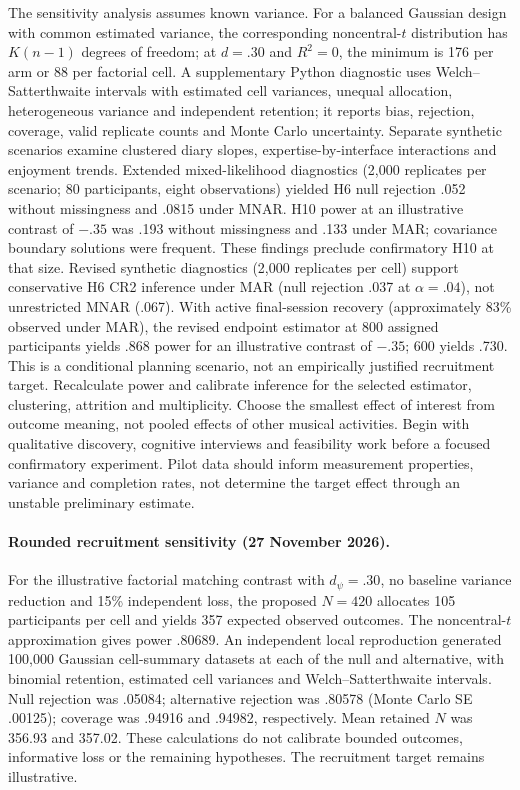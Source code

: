 The sensitivity analysis assumes known variance. For a balanced Gaussian design with common estimated variance, the corresponding noncentral-$t$ distribution has $K(n-1)$ degrees of freedom; at $d=.30$ and $R^2=0$, the minimum is 176 per arm or 88 per factorial cell. A supplementary Python diagnostic uses Welch--Satterthwaite intervals with estimated cell variances, unequal allocation, heterogeneous variance and independent retention; it reports bias, rejection, coverage, valid replicate counts and Monte Carlo uncertainty. Separate synthetic scenarios examine clustered diary slopes, expertise-by-interface interactions and enjoyment trends. Extended mixed-likelihood diagnostics (2,000 replicates per scenario; 80 participants, eight observations) yielded H6 null rejection .052 without missingness and .0815 under MNAR. H10 power at an illustrative contrast of $-.35$ was .193 without missingness and .133 under MAR; covariance boundary solutions were frequent. These findings preclude confirmatory H10 at that size. Revised synthetic diagnostics (2,000 replicates per cell) support conservative H6 CR2 inference under MAR (null rejection .037 at $\alpha=.04$), not unrestricted MNAR (.067). With active final-session recovery (approximately 83\% observed under MAR), the revised endpoint estimator at 800 assigned participants yields .868 power for an illustrative contrast of $-.35$; 600 yields .730. This is a conditional planning scenario, not an empirically justified recruitment target. Recalculate power and calibrate inference for the selected estimator, clustering, attrition and multiplicity. Choose the smallest effect of interest from outcome meaning, not pooled effects of other musical activities. Begin with qualitative discovery, cognitive interviews and feasibility work before a focused confirmatory experiment. Pilot data should inform measurement properties, variance and completion rates, not determine the target effect through an unstable preliminary estimate.


\paragraph{Rounded recruitment sensitivity (27 November 2026).}
For the illustrative factorial matching contrast with $d_\psi=.30$, no baseline variance reduction and 15\% independent loss, the proposed $N=420$ allocates 105 participants per cell and yields 357 expected observed outcomes. The noncentral-$t$ approximation gives power .80689. An independent local reproduction generated 100,000 Gaussian cell-summary datasets at each of the null and alternative, with binomial retention, estimated cell variances and Welch--Satterthwaite intervals. Null rejection was .05084; alternative rejection was .80578 (Monte Carlo SE .00125); coverage was .94916 and .94982, respectively. Mean retained $N$ was 356.93 and 357.02. These calculations do not calibrate bounded outcomes, informative loss or the remaining hypotheses. The recruitment target remains illustrative.


